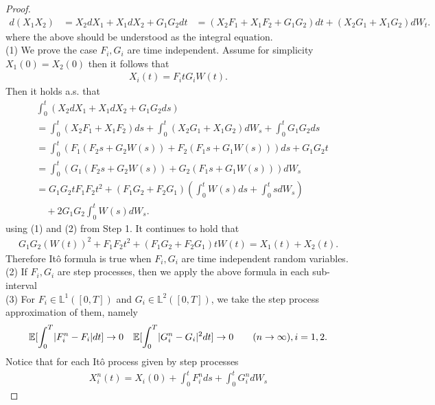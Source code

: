 \begin{proof}
  \begin{align*}
    d(X_{1}X_{2}) &= X_{2}dX_{1} + X_{1}dX_{2} + G_{1}G_{2} dt
                  &=(X_{2}F_{1}+X_{1}F_{2}+G_{1}G_{2})dt + (X_{2}G_{1}+X_{1}G_{2})dW_t
  .\end{align*}
  where the above should be understood as the integral equation.\\
  (1) We prove the case $F_i,G_i$ are time independent. Assume for simplicity $X_{1}(0) = X_{2}(0)$ then it follows that 
  \begin{align*}
    X_i(t) = F_it G_iW(t)
  .\end{align*}
  Then it holds a.s. that 
  \begin{align*}
    &\int_0^{t} (X_{2}dX_{1} + X_{1}dX_{2} + G_{1}G_{2} ds) \\
    &= \int_0^{t} (X_{2}F_{1}+X_{1}F_{2}) ds + \int_0^{t} (X_{2}G_{1}+X_{1}G_{2}) dW_s + \int_0^{t} G_{1}G_{2}ds   \\
    &= \int_0^{t} \left( F_{1}(F_{2}s + G_{2}W(s))  + F_{2}(F_{1}s+G_{1}W(s))\right) ds + G_{1}G_{2}t\\
    &= \int_0^{t} \left( G_{1}(F_{2}s + G_{2}W(s)) + G_{2}(F_{1}s+G_{1}W(s)) \right) dW_s \\
    &= G_{1}G_{2}t F_{1}F_{2}t^2+(F_{1}G_{2}+F_{2}G_{1})\left( \int_0^{t}W(s) ds + \int_0^{t} s dW_s   \right) \\
    & \quad + 2G_{1}G_{2} \int_0^{t} W(s) dW_s 
  .\end{align*}
  using (1) and (2) from Step 1. It continues to hold that 
  \begin{align*}
    G_{1}G_{2}(W(t))^2  + F_{1}F_{2}t^2 + (F_{1}G_{2}+F_{2}G_{1})tW(t) = X_{1}(t)+X_{2}(t)
  .\end{align*}
  Therefore It\^o formula is true when $F_i,G_i$ are time independent random variables.\\
  (2) If $F_i,G_i$ are step processes, then we apply the above formula in each sub-interval\\
  (3) For $F_i \in  \mathbb{L}^1([0,T])$ and $G_i \in  \mathbb{L}^2([0,T])$, we take the step process approximation of them, namely
  \begin{align*}
    \mathbb{E}[\int_0^{T} \lvert F_i^{n} - F_i \rvert dt ] \to 0 \quad \mathbb{E}[\int_0^{T} \lvert G_i^{n} - G_i \rvert^2 dt ] \to 0 \qquad (n\to \infty), i=1,2
  .\end{align*}
  Notice that for each It\^o process given by step processes 
  \begin{align*}
    X_i^{n}(t) = X_i(0) + \int_0^{t} F_i^{n} ds + \int_0^{t} G_i^{n} dW_s     

\end{align*}
\end{proof}
